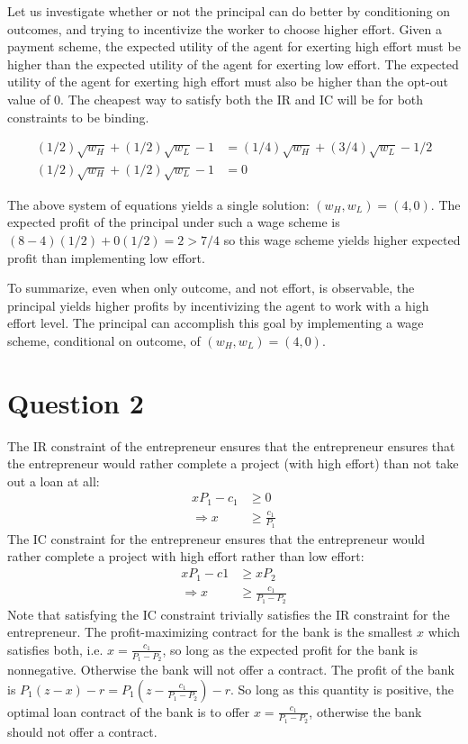\documentclass[11pt]{article} %
\begin{document}
Let us investigate whether or not the principal can do better by conditioning on outcomes, and trying to incentivize the worker to choose higher effort. Given a payment scheme, the expected utility of the agent for exerting high effort must be higher than the expected utility of the agent for exerting low effort. The expected utility of the agent for exerting high effort must also be higher than the opt-out value of $0$. The cheapest way to satisfy both the IR and IC will be for both constraints to be binding.

\begin{align*}
(1/2)\sqrt{w_H} + (1/2)\sqrt{w_L} - 1 &= (1/4)\sqrt{w_H} + (3/4)\sqrt{w_L} - 1/2\\
(1/2)\sqrt{w_H} + (1/2)\sqrt{w_L} - 1 &= 0
\end{align*}

The above system of equations yields a single solution: $(w_H,w_L) = (4,0).$ The expected profit of the principal under such a wage scheme is $(8-4)(1/2) + 0(1/2) = 2>7/4$ so this wage scheme yields higher expected profit than implementing low effort.

To summarize, even when only outcome, and not effort, is observable, the principal yields higher profits by incentivizing the agent to work with a high effort level. The principal can accomplish this goal by implementing a wage scheme, conditional on outcome, of $(w_H,w_L) = (4,0)$.
\section{Question 2} %
The IR constraint of the entrepreneur ensures that the entrepreneur ensures that the entrepreneur would rather complete a project (with high effort) than not take out a loan at all:
\begin{align*}
xP_1 - c_1 &\geq 0\\
\Rightarrow x &\geq \frac{c_1}{P_1}
\end{align*}
The IC constraint for the entrepreneur ensures that the entrepreneur would rather complete a project with high effort rather than low effort:
\begin{align*}
xP_1 - c1 &\geq x P_2 \\
\Rightarrow x &\geq \frac{c_1}{P_1-P_2}
\end{align*}
Note that satisfying the IC constraint trivially satisfies the IR constraint for the entrepreneur. The profit-maximizing contract for the bank is the smallest $x$ which satisfies both, i.e. $x = \frac{c_1}{P_1-P_2}$, so long as the expected profit for the bank is nonnegative. Otherwise the bank will not offer a contract. The profit of the bank is $P_1(z-x) -r = P_1\left(z - \frac{c_1}{P_1 - P_2}\right) - r$. So long as this quantity is positive, the optimal loan contract of the bank is to offer $x = \frac{c_1}{P_1-P_2}$, otherwise the bank should not offer a contract.
\end{document}
